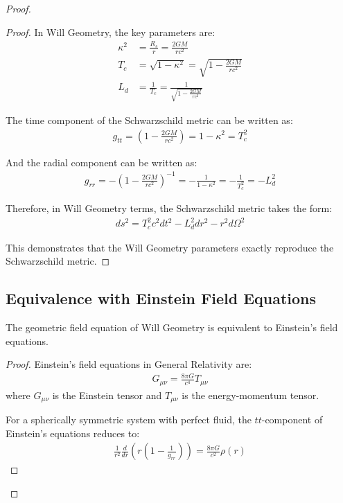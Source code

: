 \documentclass{article}
\begin{document}
\begin{proof}
\begin{proof}
In Will Geometry, the key parameters are:
\begin{align}
\kappa^2 &= \frac{R_s}{r} = \frac{2GM}{rc^2} \\
T_c &= \sqrt{1-\kappa^2} = \sqrt{1-\frac{2GM}{rc^2}} \\
L_d &= \frac{1}{T_c} = \frac{1}{\sqrt{1-\frac{2GM}{rc^2}}}
\end{align}

The time component of the Schwarzschild metric can be written as:
\begin{align}
g_{tt} = \left(1-\frac{2GM}{rc^2}\right) = 1-\kappa^2 = T_c^2
\end{align}

And the radial component can be written as:
\begin{align}
g_{rr} = -\left(1-\frac{2GM}{rc^2}\right)^{-1} = -\frac{1}{1-\kappa^2} = -\frac{1}{T_c^2} = -L_d^2
\end{align}

Therefore, in Will Geometry terms, the Schwarzschild metric takes the form:
\begin{align}
ds^2 = T_c^2 c^2dt^2 - L_d^2 dr^2 - r^2d\Omega^2
\end{align}

This demonstrates that the Will Geometry parameters exactly reproduce the Schwarzschild metric.
\end{proof}
\subsection{Equivalence with Einstein Field Equations}
\begin{theorem}
The geometric field equation of Will Geometry is equivalent to Einstein's field equations.
\end{theorem}

\begin{proof}
Einstein's field equations in General Relativity are:
\begin{align}
G_{\mu\nu} = \frac{8\pi G}{c^4}T_{\mu\nu}
\end{align}
where $G_{\mu\nu}$ is the Einstein tensor and $T_{\mu\nu}$ is the energy-momentum tensor.

For a spherically symmetric system with perfect fluid, the $tt$-component of Einstein's equations reduces to:
\begin{align}
\frac{1}{r^2}\frac{d}{dr}\left(r\left(1-\frac{1}{g_{rr}}\right)\right) = \frac{8\pi G}{c^2}\rho(r)
\end{align}


\end{proof}
\end{proof}
\end{document}

